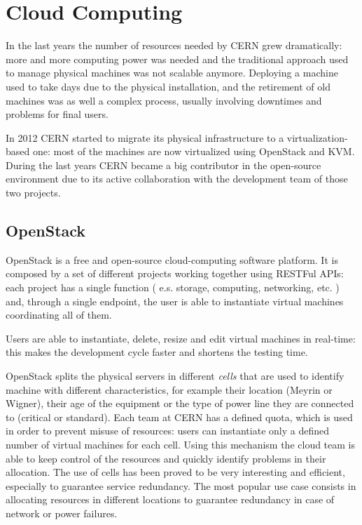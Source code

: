 \section{Cloud Computing}

In the last years the number of resources needed by CERN grew
dramatically: more and more computing power was needed and the traditional
approach used to manage physical machines was not scalable anymore.
Deploying a machine used to take days due to the physical installation,
and the retirement of old machines was as well a complex process, usually
involving downtimes and problems for final users.

In 2012 CERN started to migrate its physical infrastructure to
a virtualization-based one: most of the machines are now virtualized using
OpenStack and KVM. During the last years CERN became a big contributor in
the open-source environment due to its active collaboration with the
development team of those two projects.

\subsection{OpenStack}

OpenStack \cite{OpenStackWebsite} is a free and open-source
cloud-computing software platform. It is composed by a set of different
projects working together using RESTFul APIs: each project has a single
function ( e.s. storage, computing, networking, etc. ) and, through
a single endpoint, the user is able to instantiate virtual machines
coordinating all of them.

Users are able to instantiate, delete, resize and edit virtual machines in
real-time: this makes the development cycle faster and shortens the
testing time.

OpenStack splits the physical servers in different \textit{cells} that are
used to identify machine with different characteristics, for example their
location (Meyrin or Wigner), their age of the equipment or the type of
power line they are connected to (critical or standard). Each team at CERN
has a defined quota, which is used in order to prevent misuse of
resources: users can instantiate only a defined number of virtual machines
for each cell. Using this mechanism the cloud team is able to keep control
of the resources and quickly identify problems in their allocation. The
use of cells has been proved to be very interesting and efficient,
especially to guarantee service redundancy. The most popular use case
consists in allocating resources in different locations to guarantee
redundancy in case of network or power failures.

